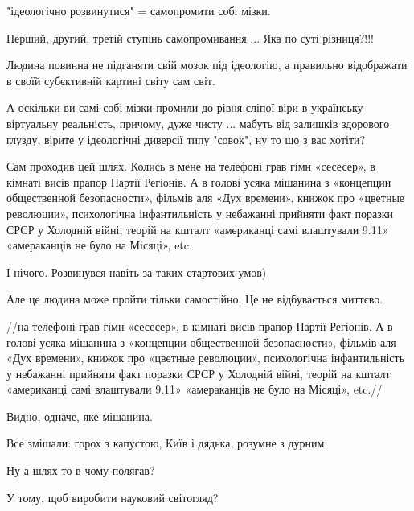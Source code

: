 \begin{itemize}
\begin{itemize}
"ідеологічно розвинутися" = самопромити собі мізки.

Перший, другий, третій ступінь самопромивання ... Яка по суті різниця?!!!

Людина повинна не підганяти свій мозок під ідеологію, а правильно відображати в
своїй субєктивній картині світу сам світ.

А оскільки ви самі собі мізки промили до рівня сліпої віри в українську
віртуальну реальність, причому, дуже чисту ... мабуть від залишків здорового
глузду, вірите у ідеологічні диверсії типу "совок", ну то що з вас хотіти?

 

Сам проходив цей шлях. Колись в мене на телефоні грав гімн «сесесер», в кімнаті
висів прапор Партії Регіонів. А в голові усяка мішанина з «концепции
общественной безопасности», фільмів аля «Дух времени», книжок про «цветные
революции», психологічна інфантильність у небажанні прийняти факт поразки СРСР
у Холодній війні, теорій на кшталт «американці самі влаштували 9.11»
«амераканців не було на Місяці», etc.

І нічого. Розвинувся навіть за таких стартових умов)

Але це людина може пройти тільки самостійно. Це не відбувається миттєво.

 

//на телефоні грав гімн «сесесер», в кімнаті висів прапор Партії Регіонів. А в
голові усяка мішанина з «концепции общественной безопасности», фільмів аля «Дух
времени», книжок про «цветные революции», психологічна інфантильність у
небажанні прийняти факт поразки СРСР у Холодній війні, теорій на кшталт
«американці самі влаштували 9.11» «амераканців не було на Місяці», etc.//

Видно, одначе, яке мішанина.

Все змішали: горох з капустою, Київ і дядька, розумне з дурним.

Ну а шлях то в чому полягав?

У тому, щоб виробити науковий світогляд?


\end{itemize}
\end{itemize}
